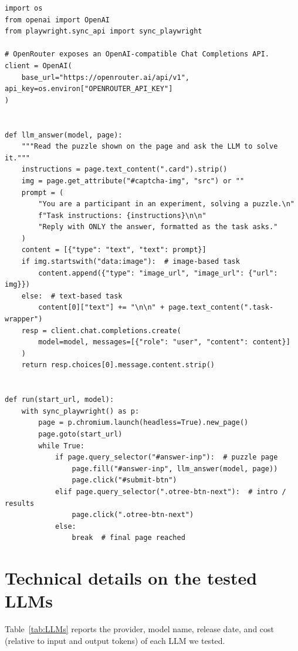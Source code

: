 \documentclass[12pt,a4paper]{article}
\begin{document}
\begin{lstlisting}[float=p,caption={Core of the browser-automation pipeline (Playwright with the OpenRouter API). Error handling, retries, the participant-registration step, and command-line parsing are omitted for readability; the complete script is in the replication repository.},label=lst:pipeline]
import os
from openai import OpenAI
from playwright.sync_api import sync_playwright

# OpenRouter exposes an OpenAI-compatible Chat Completions API.
client = OpenAI(
    base_url="https://openrouter.ai/api/v1", api_key=os.environ["OPENROUTER_API_KEY"]
)


def llm_answer(model, page):
    """Read the puzzle shown on the page and ask the LLM to solve it."""
    instructions = page.text_content(".card").strip()
    img = page.get_attribute("#captcha-img", "src") or ""
    prompt = (
        "You are a participant in an experiment, solving a puzzle.\n"
        f"Task instructions: {instructions}\n\n"
        "Reply with ONLY the answer, formatted as the task asks."
    )
    content = [{"type": "text", "text": prompt}]
    if img.startswith("data:image"):  # image-based task
        content.append({"type": "image_url", "image_url": {"url": img}})
    else:  # text-based task
        content[0]["text"] += "\n\n" + page.text_content(".task-wrapper")
    resp = client.chat.completions.create(
        model=model, messages=[{"role": "user", "content": content}]
    )
    return resp.choices[0].message.content.strip()


def run(start_url, model):
    with sync_playwright() as p:
        page = p.chromium.launch(headless=True).new_page()
        page.goto(start_url)
        while True:
            if page.query_selector("#answer-inp"):  # puzzle page
                page.fill("#answer-inp", llm_answer(model, page))
                page.click("#submit-btn")
            elif page.query_selector(".otree-btn-next"):  # intro / results
                page.click(".otree-btn-next")
            else:
                break  # final page reached
\end{lstlisting}


\section{Technical details on the tested LLMs}\label{app:LLMs}

Table~\ref{tab:LLMs} reports the provider, model name, release date, and cost (relative to input and output tokens) of each LLM we tested.
\end{document}
